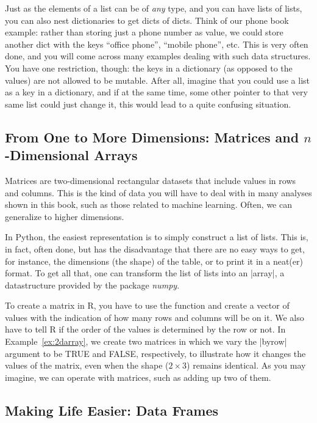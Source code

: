 Just as the elements of a list can be of \emph{any} type, and you can
have lists of lists, you can also nest dictionaries to get dicts of
dicts. Think of our phone book example: rather than storing just a
phone number as value, we could store another dict with the keys
``office phone'', ``mobile phone'', etc. This is very often done, and you
will come across many examples dealing with such data structures.
You have one restriction, though: the keys in a dictionary (as opposed
to the values) are not allowed to be mutable. After all, imagine that
you could use a list as a key in a dictionary, and if at the same time,
some other pointer to that very same list could just change it, this
would lead to a quite confusing situation.




\subsection{From One to More Dimensions: Matrices and $n$-Dimensional Arrays}

 Matrices are two-dimensional rectangular datasets that include values
in rows and columns. This is the kind of data you will have to deal
with in many analyses shown in this book, such as those related to
machine learning. Often, we can generalize to higher dimensions.


In Python, the easiest representation is to simply construct a list of
lists. This is, in fact, often done, but has the disadvantage that
there are no easy ways to get, for instance, the dimensions (the
shape) of the table, or to print it in a neat(er) format. To get all
that, one can transform the list of lists into an |array|, a
datastructure provided by the package \emph{numpy}.

To create a matrix in R, you have to use the function  and
create a vector of values with the indication of how many rows and
columns will be on it. We also have to tell R if the order of the
values is determined by the row or not. In Example~\ref{ex:2darray}, we create
two matrices in which we vary the |byrow| argument to be TRUE and
FALSE, respectively, to illustrate how it changes the values of the
matrix, even when the shape ($2 \times3$) remains identical. As you may
imagine, we can operate with matrices, such as adding up two of them.


\subsection{Making Life Easier: Data Frames}


